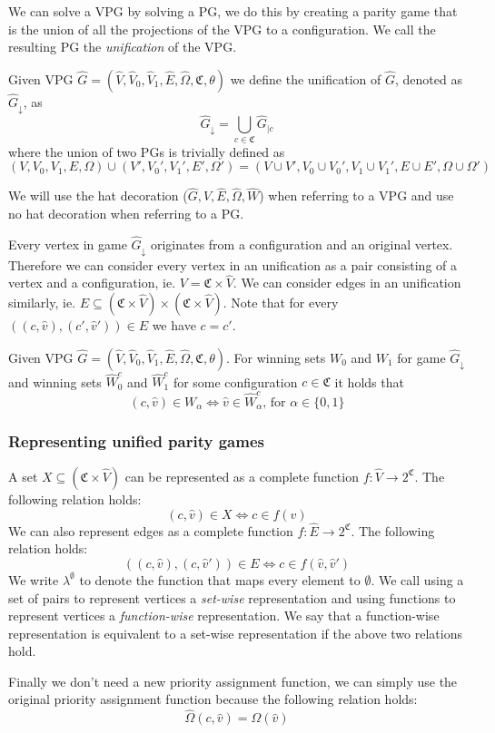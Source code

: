 We can solve a VPG by solving a PG, we do this by creating a parity game that is the union of all the projections of the VPG to a configuration. We call the resulting PG the \textit{unification} of the VPG.
\begin{definition}
Given VPG $\hat{G} = (\hat{V},\hat{V}_0,\hat{V}_1, \hat{E},\hat{\Omega}, \mathfrak{C},\theta)$ we define the unification of $\hat{G}$, denoted as $\hat{G}_{\downarrow}$, as
\[  \hat{G}_{\downarrow} = \bigcup_{c\in \mathfrak{C}}\hat{G}_{|c} \]
where the union of two PGs is trivially defined as
\[ (V,V_0,V_1,E,\Omega) \cup (V',V_0',V_1',E',\Omega') = (V \cup V', V_0 \cup V_0', V_1 \cup V_1', E \cup E', \Omega \cup \Omega') \]
\end{definition}
We will use the hat decoration ($\hat{G},\hat{V},\hat{E},\hat{\Omega},\hat{W}$) when referring to a VPG and use no hat decoration when referring to a PG.

Every vertex in game $\hat{G}_{\downarrow}$ originates from a configuration and an original vertex. Therefore we can consider every vertex in an unification as a pair consisting of a vertex and a configuration, ie. $V = \mathfrak{C} \times \hat{V}$. We can consider edges in an unification similarly, ie. $E \subseteq (\mathfrak{C} \times \hat{V}) \times (\mathfrak{C} \times \hat{V})$. Note that for every $((c,\hat{v}) , (c',\hat{v}')) \in E$ we have $c = c'$.

\begin{theorem}
	Given VPG $\hat{G} =  (\hat{V},\hat{V}_0,\hat{V}_1, \hat{E},\hat{\Omega}, \mathfrak{C},\theta)$. For winning sets $W_0$ and $W_1$ for game $\hat{G}_{\downarrow}$ and winning sets $\hat{W}^c_0$ and $\hat{W}^c_1$ for some configuration $c \in \mathfrak{C}$ it holds that
	\[ (c,\hat{v}) \in W_\alpha \iff \hat{v} \in \hat{W}^c_\alpha\text{, for }\alpha \in \{0,1\} \]
\end{theorem}

\subsubsection{Representing unified parity games}
A set $X \subseteq (\mathfrak{C} \times \hat{V})$ can be represented as a complete function $f : \hat{V} \rightarrow 2^\mathfrak{C}$. The following relation holds:
\[ (c,\hat{v}) \in X \iff c \in f(\hat{v}) \]
We can also represent edges as a complete function $f : \hat{E} \rightarrow 2^\mathfrak{C}$. The following relation holds:
\[ ((c,\hat{v}),(c,\hat{v}')) \in E \iff c \in f(\hat{v},\hat{v}') \]
We write $\lambda^\emptyset$ to denote the function that maps every element to $\emptyset$. We call using a set of pairs to represent vertices a \textit{set-wise} representation and using functions to represent vertices a \textit{function-wise} representation. We say that a function-wise representation is equivalent to a set-wise representation if the above two relations hold.


Finally we don't need a new priority assignment function, we can simply use the original priority assignment function because the following relation holds:
\[ \hat{\Omega}(c,\hat{v}) = \Omega(\hat{v}) \]